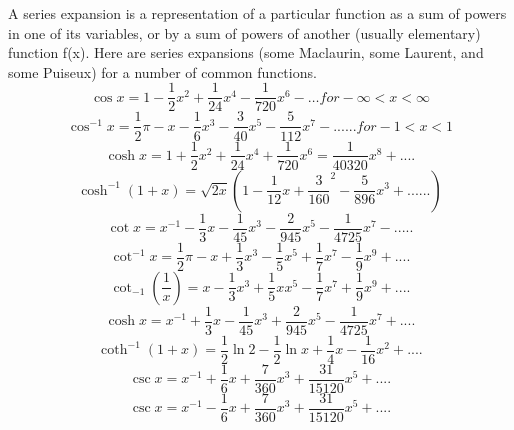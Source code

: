 	A series expansion is a representation of a particular function as a sum of powers in one of its variables, or by a sum of powers of another (usually elementary) function  f(x).
	Here are series expansions (some Maclaurin, some Laurent, and some Puiseux) for a number of common functions.
\newline
\begin{equation}
	\cos x = 1- \frac{1}{2}x^{2}+\frac{1}{24}x^{4}-\frac{1}{720}x^{6} - \ldots for -\infty < x < \infty	
\end{equation}
\begin{equation}
	\cos^{-1} x = \frac{1}{2} \pi - x - \frac{1}{6} x^{3} - \frac{3}{40} x^{5} - \frac{5}{112} x^{7} - ......for - 1 < x < 1
\end{equation}
\begin{equation}
	\cosh x = 1 + \frac{1}{2} x^2  + \frac{1}{24} x^4 + \frac{1}{720} x^6 = \frac{1}{40320} x^8 + ....
\end{equation}
\begin{equation}
	\cosh^{-1} (1+x) = \sqrt{2x} (1 - \frac{1}{12} x + \frac{3}{160} ^2 - \frac{5}{896} x^3 + ......) 
\end{equation}
\begin{equation}
	\cot x = x^{-1} - \frac{1}{3} x - \frac{1}{45} x^3 - \frac{2}{945} x^5 - \frac{1}{4725} x^7 - .....
\end{equation}
\begin{equation}
	\cot^{-1} x = \frac{1}{2} \pi - x + \frac{1}{3} x^3 - \frac{1}{5} x^5 + \frac{1}{7} x^7 - \frac{1}{9} x^9 + ....	
\end{equation}
\begin{equation}
	\cot_{-1}(\frac{1}{x}) = x - \frac{1}{3} x^3 + \frac{1}{5} x x^5 - \frac{1}{7} x^7 + \frac{1}{9} x^9 + ....
\end{equation}
\begin{equation}
	\cosh x = x^{-1} + \frac{1}{3} x - \frac{1}{45} x^3 + \frac{2}{945} x^5 - \frac{1}{4725} x^7 + ....
\end{equation}
\begin{equation}
	\coth^{-1}(1+x) = \frac{1}{2} \ln 2 - \frac{1}{2} \ln x + \frac{1}{4} x - \frac{1}{16} x^2 + ....
\end{equation}
\begin{equation}
	\csc x = x^{-1} + \frac{1}{6} x + \frac{7}{360} x^3 + \frac{31}{15120} x^5 + ....
\end{equation}
\begin{equation}
	\csc x = x^{-1} - \frac{1}{6} x + \frac{7}{360} x^3 + \frac{31}{15120} x^5 + ....
\end{equation}
